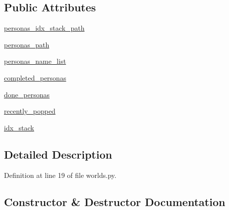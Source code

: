 \subsection*{Public Attributes}
\begin{DoxyCompactItemize}
\item 
\hyperlink{classparlai_1_1mturk_1_1tasks_1_1personachat_1_1personachat__rephrase_1_1worlds_1_1PersonasGenerator_a47aadd2ff6148aa086887f039f046224}{personas\+\_\+idx\+\_\+stack\+\_\+path}
\item 
\hyperlink{classparlai_1_1mturk_1_1tasks_1_1personachat_1_1personachat__rephrase_1_1worlds_1_1PersonasGenerator_a1881802d9147808660941e18155f4f4a}{personas\+\_\+path}
\item 
\hyperlink{classparlai_1_1mturk_1_1tasks_1_1personachat_1_1personachat__rephrase_1_1worlds_1_1PersonasGenerator_ab4a565162feafbcbc20f9f6029c41f34}{personas\+\_\+name\+\_\+list}
\item 
\hyperlink{classparlai_1_1mturk_1_1tasks_1_1personachat_1_1personachat__rephrase_1_1worlds_1_1PersonasGenerator_a7ed591a1f642f4f9113a90cf68fb11d4}{completed\+\_\+personas}
\item 
\hyperlink{classparlai_1_1mturk_1_1tasks_1_1personachat_1_1personachat__rephrase_1_1worlds_1_1PersonasGenerator_a64b6d5528c2c230c4736f68c59311fa2}{done\+\_\+personas}
\item 
\hyperlink{classparlai_1_1mturk_1_1tasks_1_1personachat_1_1personachat__rephrase_1_1worlds_1_1PersonasGenerator_af672da71808e22edc2bbb5ba41c1af13}{recently\+\_\+popped}
\item 
\hyperlink{classparlai_1_1mturk_1_1tasks_1_1personachat_1_1personachat__rephrase_1_1worlds_1_1PersonasGenerator_a62caba399c9988fc5ddb9ec2ae68eb50}{idx\+\_\+stack}
\end{DoxyCompactItemize}


\subsection{Detailed Description}


Definition at line 19 of file worlds.\+py.



\subsection{Constructor \& Destructor Documentation}
\mbox{\label{classparlai_1_1mturk_1_1tasks_1_1personachat_1_1personachat__rephrase_1_1worlds_1_1PersonasGenerator_a113657139eb52b53cdb044cefb9f5112}} 
